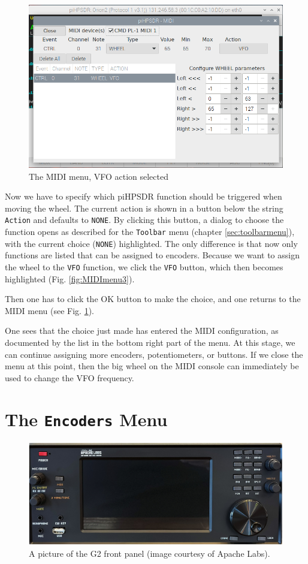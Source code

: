 \documentclass[12pt]{book}
\def\rett#1{\texttt{\color{red}#1}}
\def\bltt#1{\texttt{\color{blue}#1}}
\def\pH{pi\-HPSDR\xspace}
\begin{document}
\begin{figure}[ht!]
\center
\includegraphics[width=12cm]{MIDImenu4.png}
\caption{The MIDI menu, VFO action selected}
\label{fig:MIDImenu4}
\end{figure}
Now we have to specify which \pH function should be triggered when moving the wheel.
The current action is shown in a button below the string \rett{Action} and defaults to \bltt{NONE}.
By clicking this button, a dialog to choose the function opens as described for the
\bltt{Toolbar} menu (chapter \ref{sec:toolbarmenu}), with the current choice (\bltt{NONE})
highlighted. The only difference is that now only functions are listed that can be
assigned to encoders.
Because we want to assign the wheel to the \bltt{VFO} function, we click
the \bltt{VFO} button, which then becomes highlighted (Fig. \ref{fig:MIDImenu3}).



 Then one has to click the OK button to make the choice, and one returns to the
 MIDI menu (see Fig. \ref{fig:MIDImenu4}).

One sees that the choice just made has entered the MIDI configuration, as documented by the
list in the bottom right part of the menu. At this stage, we can continue
assigning more encoders, potentiometers, or buttons. If we close the menu at
this point, then the big wheel on the MIDI console can immediately be used
to change the VFO frequency.

\section{The \texttt{Encoders} Menu}
\begin{figure}[ht!]
\center
\includegraphics[width=12cm]{g2_frontpanel.png}
\caption{A picture of the G2 front panel (image courtesy of Apache Labs).}
\label{fig:g2_frontpanel}
\end{figure}
\end{document}
